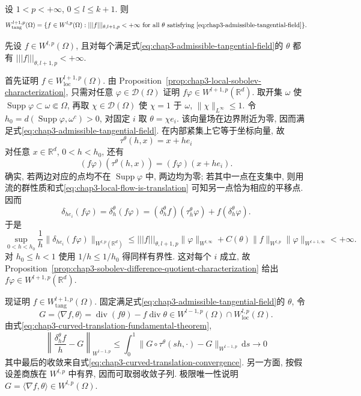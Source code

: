 \begin{Theorem}
\label{thm:chap3-tangential-space-characterization}
设 $1<p<+\infty$, $0\leq l\leq k+1$. 则
\[
 W_{\mathrm{tang}}^{l+1,p}(\Omega)
 =\{f\in W^{l,p}(\Omega):|||f|||_{\theta,l+1,p}<+\infty
 \text{ for all }\theta\text{ satisfying \eqref{eq:chap3-admissible-tangential-field}}\}.
\]
\end{Theorem}

\begin{Proof}
先设 $f\in W^{l,p}(\Omega)$, 且对每个满足式\eqref{eq:chap3-admissible-tangential-field}的 $\theta$ 都有 $|||f|||_{\theta,l+1,p}<+\infty$.

首先证明 $f\in W_{\mathrm{loc}}^{l+1,p}(\Omega)$. 由 Proposition~\ref{prop:chap3-local-sobolev-characterization}, 只需对任意 $\varphi\in\mathcal D(\Omega)$ 证明 $f\varphi\in W^{l+1,p}(\mathbb R^d)$. 取开集 $\omega$ 使 $\operatorname{Supp}\varphi\subset\omega\Subset\Omega$, 再取 $\chi\in\mathcal D(\Omega)$ 使 $\chi=1$ 于 $\omega$, $\|\chi\|_{L^\infty}\leq1$. 令 $h_0=d(\operatorname{Supp}\varphi,\omega^c)>0$, 对固定 $i$ 取 $\theta=\chi e_i$. 该向量场在边界附近为零, 因而满足式\eqref{eq:chap3-admissible-tangential-field}. 在内部紧集上它等于坐标向量, 故
\begin{equation}
 \tau^\theta(h,x)=x+he_i
 \label{eq:chap3-local-flow-is-translation}
\end{equation}
对任意 $x\in\mathbb R^d$, $0<h<h_0$, 还有
\begin{equation}
 (f\varphi)(\tau^\theta(h,x))=(f\varphi)(x+he_i).
 \label{eq:chap3-local-curved-flat-translation}
\end{equation}
确实, 若两边对应的点均不在 $\operatorname{Supp}\varphi$ 中, 两边均为零; 若其中一点在支集中, 则用流的群性质和式\eqref{eq:chap3-local-flow-is-translation} 可知另一点恰为相应的平移点. 因而
\[
 \delta_{he_i}(f\varphi)=\delta_h^\theta(f\varphi)
 =(\delta_h^\theta f)(\tau_h^\theta\varphi)+f(\delta_h^\theta\varphi).
\]
于是
\[
 \sup_{0<h<h_0}\frac1h\|\delta_{he_i}(f\varphi)\|_{W^{l,p}(\mathbb R^d)}
 \leq|||f|||_{\theta,l+1,p}\|\varphi\|_{W^{l,\infty}}
 +C(\theta)\|f\|_{W^{l,p}}\|\varphi\|_{W^{l+1,\infty}}<+\infty.
\]
对 $h_0\leq h<1$ 使用 $1/h\leq1/h_0$ 得同样有界性. 这对每个 $i$ 成立, 故 Proposition~\ref{prop:chap3-sobolev-difference-quotient-characterization} 给出 $f\varphi\in W^{l+1,p}(\mathbb R^d)$.

现证明 $f\in W_{\mathrm{tang}}^{l+1,p}(\Omega)$. 固定满足式\eqref{eq:chap3-admissible-tangential-field}的 $\theta$, 令
\[
 G=\langle\nabla f,\theta\rangle
 =\operatorname{div}(f\theta)-f\operatorname{div}\theta
 \in W^{l-1,p}(\Omega)\cap W_{\mathrm{loc}}^{l,p}(\Omega).
\]
由式\eqref{eq:chap3-curved-translation-fundamental-theorem},
\[
 \left\|\frac{\delta_h^\theta f}{h}-G\right\|_{W^{l-1,p}}
 \leq\int_0^1\|G\circ\tau^\theta(sh,\cdot)-G\|_{W^{l-1,p}}\,\mathrm ds
 \longrightarrow0
\]
其中最后的收敛来自式\eqref{eq:chap3-curved-translation-convergence}. 另一方面, 按假设差商族在 $W^{l,p}$ 中有界, 因而可取弱收敛子列. 极限唯一性说明 $G=\langle\nabla f,\theta\rangle\in W^{l,p}(\Omega)$.


\end{Proof}
